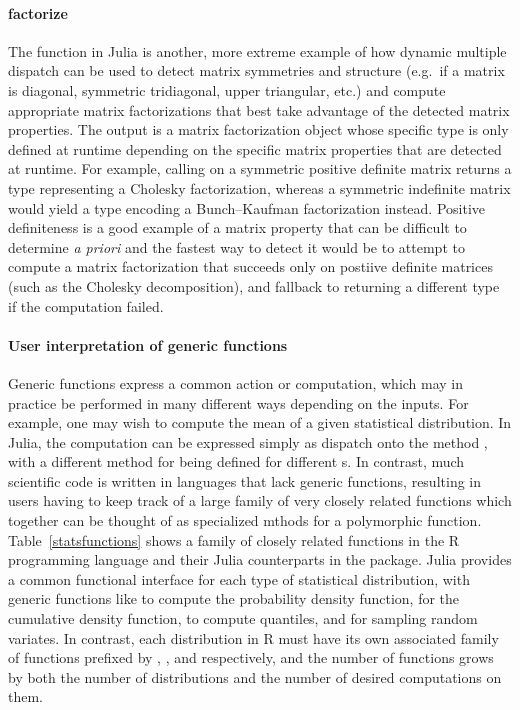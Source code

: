 \documentclass[pldi]{sigplanconf-pldi15}
\begin{document}
\paragraph{factorize}
The  function in Julia is another, more extreme example of how
dynamic multiple dispatch can be used to detect matrix symmetries and structure
(e.g.\ if a matrix is diagonal, symmetric tridiagonal, upper triangular, etc.)
and compute appropriate matrix factorizations that best take advantage of the
detected matrix properties. The output is a matrix factorization object whose
specific type is only defined at runtime depending on the specific matrix
properties that are detected at runtime. For example, calling 
on a symmetric positive definite matrix returns a  type
representing a Cholesky factorization, whereas a symmetric indefinite matrix
would yield a  type encoding a Bunch--Kaufman factorization
instead. Positive definiteness is a good example of a matrix property that can
be difficult to determine \textit{a priori} and the fastest way to detect it
would be to attempt to compute a matrix factorization that succeeds only on
postiive definite matrices (such as the Cholesky decomposition), and fallback
to returning a different type if the computation failed.

\paragraph{User interpretation of generic functions}
Generic functions express a common action or computation, which may in
practice be performed in many different ways depending on the inputs. For
example, one may wish to compute the mean of a given statistical distribution.
In Julia, the computation can be expressed simply as dispatch onto the method
, with a different method for  being
defined for different s. In contrast, much scientific code
is written in languages that lack generic functions, resulting in users having
to keep track of a large family of very closely related functions which
together can be thought of as specialized mthods for a polymorphic function.
Table~\ref{statsfunctions} shows a family of closely related functions in the R
programming language and their Julia counterparts in the
 package. Julia provides a common functional interface
for each type of statistical distribution, with generic functions like
 to compute the probability density function,  for the
cumulative density function,  to compute quantiles, and
 for sampling random variates. In contrast, each distribution in R
must have its own associated family of functions prefixed by ,
,  and  respectively, and the number of functions grows
by both the number of distributions and the number of desired computations on
them.
\end{document}
